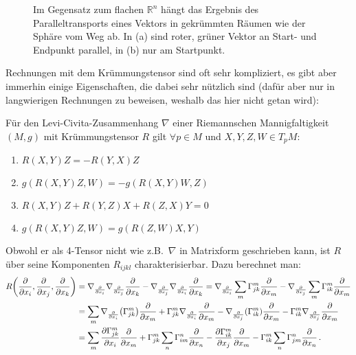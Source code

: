 \documentclass[../H_Analysis_main.tex]{subfiles}
\begin{document}
\begin{figure}
\centering

\hspace{0.06\textwidth}%

\caption[Paralleltransport]{Im Gegensatz zum flachen $\mathbb{R}^n$ hängt das Ergebnis des Paralleltransports eines Vektors in gekrümmten Räumen wie der Sphäre vom Weg ab. In (a) sind roter, grüner Vektor an Start- und Endpunkt parallel, in (b) nur am Startpunkt.}
\label{fig:paralleltransport}
\end{figure}


Rechnungen mit dem Krümmungstensor sind oft sehr kompliziert, es gibt aber immerhin einige Eigenschaften, die dabei sehr nützlich sind (dafür aber nur in langwierigen Rechnungen zu beweisen, weshalb das hier nicht getan wird):

\begin{satz}
Für den Levi-Civita-Zusammenhang $\nabla$ einer Riemannschen Mannigfaltigkeit $(M, g)$ mit Krümmungstensor $R$ gilt $\forall p \in M$ und $X, Y, Z, W \in T_p M$:
\begin{enumerate}
\item $R(X, Y) Z = - R(Y, X) Z$

\item $g(R(X, Y) Z, W) = - g(R(X, Y) W, Z)$

\item $R(X, Y) Z + R(Y, Z) X + R(Z, X) Y = 0$

\item $g(R(X, Y) Z, W) = g(R(Z, W) X, Y)$
\end{enumerate}
\end{satz}

Obwohl er als 4-Tensor nicht wie z.B.~$\nabla$ in Matrixform geschrieben kann, ist $R$ über seine Komponenten $R_{ijkl}$ charakterisierbar. Dazu berechnet man:
\begin{align*}
R\qty(\pdv{x_i}, \pdv{x_j}, \pdv{x_k}) &= \nabla_{\pdv{x_i}} \nabla_{\pdv{x_j}} \pdv{x_k} - \nabla_{\pdv{x_j}} \nabla_{\pdv{x_i}} \pdv{x_k} = \nabla_{\pdv{x_i}} \sum_m \Gamma_{jk}^m \pdv{x_m} - \nabla_{\pdv{x_j}} \sum_m \Gamma_{ik}^m \pdv{x_m}
\\
&= \sum_m \nabla_{\pdv{x_i}} \qty(\Gamma_{jk}^m) \pdv{x_m} + \Gamma_{jk}^m \nabla_{\pdv{x_i}} \pdv{x_m} - \nabla_{\pdv{x_j}} \qty(\Gamma_{ik}^m) \pdv{x_m} - \Gamma_{ik}^m \nabla_{\pdv{x_j}} \pdv{x_m}
\\
&= \sum_m \pdv{\Gamma_{jk}^m}{x_i} \pdv{x_m} + \Gamma_{jk}^m \sum_n \Gamma_{im}^n \pdv{x_n} - \pdv{\Gamma_{ik}^m}{x_j} \pdv{x_m} - \Gamma_{ik}^m  \sum_n \Gamma_{jm}^n \pdv{x_n} \, .
\end{align*}
\end{document}
